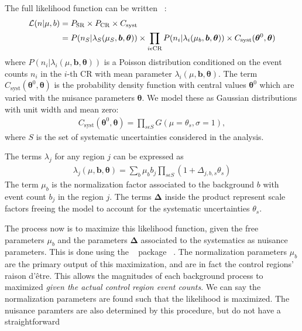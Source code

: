 The full likelihood function can be written ~\cite{Baak:2014wma}:
\begin{align}
\mathcal{L}(n | \mu, b) &= P_{\mathrm{SR}} \times P_{\mathrm{CR}} \times C_{\mathrm{syst}} \\
                  &= P(n_S | \lambda_S(\mu_{S},  \bm{b}, \bm{\theta} ) ) \times
                     \prod_{i \epsilon \text{CR}}  P(n_i | \lambda_i(\mu_b , \bm{b}, \bm{\theta}))
                     \times C_{\text{syst}}(\bm{\theta}^0 , \bm{\theta})
\end{align}
where $P(n_i | \lambda_i(\mu , \bm{b}, \bm{\theta}))$ is a Poisson distribution conditioned on the event counts $n_i$ in the $i$-th CR with mean parameter $\lambda_i(\mu , \bm{b}, \bm{\theta})$.
The term $C_{\text{syst}}(\bm{\theta}^0 , \bm{\theta})$ is the probability density function with central values $\bm{\theta}^0$ which are varied with the nuisance parameters $\bm{\theta}$.
We model these as Gaussian distributions with unit width and mean zero:
\begin{align}
C_{\text{syst}}(\bm{\theta}^0 , \bm{\theta}) = \prod_{s\epsilon S} G(\mu = \theta_s, \sigma = 1),
\end{align}
where $S$ is the set of systematic uncertainties considered in the analysis.

The terms $\lambda_j$ for any region $j$ can be expressed as
\begin{align}
\lambda_j( \mu, \bm{b},\bm{\theta}) = \sum_b \mu_b \xspace b_j \xspace \prod_{s\epsilon S} \xspace (1 + \Delta_{j,b,s} \theta_s)
\end{align}
The term $\mu_b$ is the normalization factor associated to the background $b$ with event count $b_j$ in the region $j$.
The terms $\bm{\Delta}$ inside the product represent scale factors freeing the model to account for the systematic uncertainties $\theta_s$.

The process now is to maximize this likelihood function, given the free parameters $\mu_b$ and the parameters $\bm{\Delta}$ associated to the systematics as nuisance parameters.
This is done using the \histfitter~ package ~\cite{Baak:2014wma}.
The normalization parameters $\mu_b$ are the primary output of this maximization, and are in fact the control regions' raison d'\^{e}tre.
This allows the magnitudes of each background process to maximized \textit{given the actual control region event counts}.
We can say the normalization parameters are found such that the likelihood is maximized.
The nuisance paramters are also determined by this procedure, but do not have a straightforward


